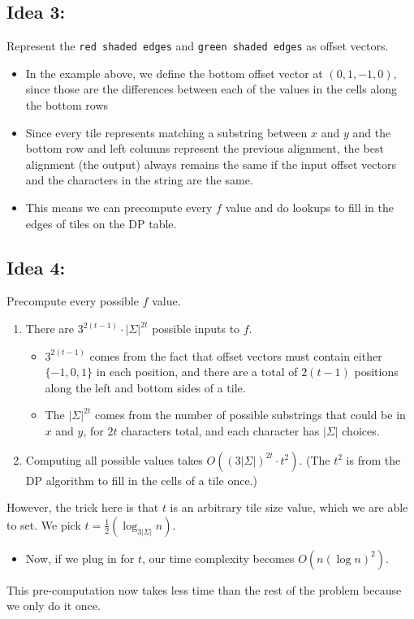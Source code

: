 \documentclass[10pt]{article}
\begin{document}
\subsection*{Idea 3:}
Represent the \texttt{red shaded edges} and \texttt{green shaded edges} as offset vectors.
\begin{itemize}
	\item In the example above, we define the bottom offset vector at $(0, 1, -1, 0)$, since those are the differences between each of the values in the cells along the bottom rows
	\item Since every tile represents matching a substring between $x$ and $y$ and the bottom row and left columns represent the previous alignment, the best alignment (the output) always remains the same if the input offset vectors and the characters in the string are the same.
	\item This means we can precompute every $f$ value and do lookups to fill in the edges of tiles on the DP table.
\end{itemize}
\subsection*{Idea 4:}
Precompute every possible $f$ value.
\begin{enumerate}[label=(\arabic*)]
	\item There are $3^{2(t - 1)} \cdot |\Sigma|^{2t}$ possible inputs to $f$.
	\begin{itemize}
	    \item $3^{2(t - 1)}$ comes from the fact that offset vectors must contain either $\{-1, 0, 1\}$ in each position, and there are a total of $2(t - 1)$ positions along the left and bottom sides of a tile.
	    \item The $|\Sigma|^{2t}$ comes from the number of possible substrings that could be in $x$ and $y$, for $2t$ characters total, and each character has $|\Sigma|$ choices.
    \end{itemize}
	\item Computing all possible values takes $O((3|\Sigma|)^{2t} \cdot t^2)$.  (The $t^2$ is from the DP algorithm to fill in the cells of a tile once.)
\end{enumerate}
However, the trick here is that $t$ is an arbitrary tile size value, which we are able to set.  We pick $t = \frac{1}{2}\left(\log_{3|\Sigma|}n\right)$.
\begin{itemize}
	\item Now, if we plug in for $t$, our time complexity becomes $O(n (\log n)^2)$.
\end{itemize}
This pre-computation now takes less time than the rest of the problem because we only do it once.
\end{document}
